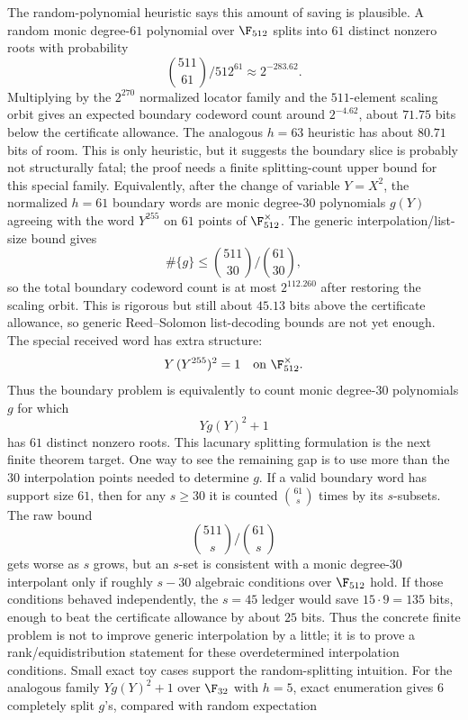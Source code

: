 The random-polynomial heuristic says this amount of saving is plausible.  A random monic degree-\(61\) polynomial over
\(\F_{512}\) splits into \(61\) distinct nonzero roots with probability
\[
\binom{511}{61}/512^{61}\approx 2^{-283.62}.
\]
Multiplying by the \(2^{270}\) normalized locator family and the \(511\)-element scaling orbit gives an expected
boundary codeword count around \(2^{-4.62}\), about \(71.75\) bits below the certificate allowance.  The analogous
\(h=63\) heuristic has about \(80.71\) bits of room.  This is only heuristic, but it suggests the boundary slice is
probably not structurally fatal; the proof needs a finite splitting-count upper bound for this special family.
Equivalently, after the change of variable \(Y=X^2\), the normalized \(h=61\) boundary words are monic degree-\(30\)
polynomials \(g(Y)\) agreeing with the word \(Y^{255}\) on \(61\) points of \(\F_{512}^\times\).  The generic
interpolation/list-size bound gives
\[
\#\{g\}\le \binom{511}{30}/\binom{61}{30},
\]
so the total boundary codeword count is at most \(2^{112.260}\) after restoring the scaling orbit.  This is rigorous
but still about \(45.13\) bits above the certificate allowance, so generic Reed--Solomon list-decoding bounds are not
yet enough.  The special received word has extra structure:
\[
Y\,(Y^{255})^2=1\quad \text{on }\F_{512}^\times.
\]
Thus the boundary problem is equivalently to count monic degree-\(30\) polynomials \(g\) for which
\[
Yg(Y)^2+1
\]
has \(61\) distinct nonzero roots.  This lacunary splitting formulation is the next finite theorem target.
One way to see the remaining gap is to use more than the \(30\) interpolation points needed to determine \(g\).  If a
valid boundary word has support size \(61\), then for any \(s\ge30\) it is counted \(\binom{61}{s}\) times by its
\(s\)-subsets.  The raw bound
\[
\binom{511}{s}/\binom{61}{s}
\]
gets worse as \(s\) grows, but an \(s\)-set is consistent with a monic degree-\(30\) interpolant only if roughly
\(s-30\) algebraic conditions over \(\F_{512}\) hold.  If those conditions behaved independently, the \(s=45\) ledger
would save \(15\cdot9=135\) bits, enough to beat the certificate allowance by about \(25\) bits.  Thus the concrete
finite problem is not to improve generic interpolation by a little; it is to prove a rank/equidistribution statement
for these overdetermined interpolation conditions.
Small exact toy cases support the random-splitting intuition.  For the analogous family \(Yg(Y)^2+1\) over
\(\F_{32}\) with \(h=5\), exact enumeration gives \(6\) completely split \(g\)'s, compared with random expectation
